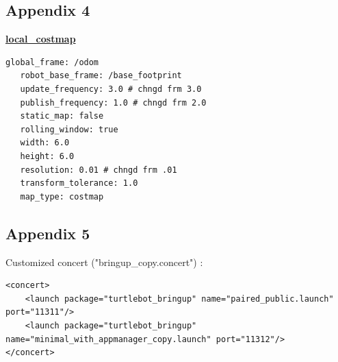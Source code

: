 \documentclass[10pt,a4paper]{article}
\begin{document}
\subsection{Appendix 4}

\underline{\textbf{local\_costmap}}
\begin{lstlisting}[frame=single]
   global_frame: /odom 
   robot_base_frame: /base_footprint 
   update_frequency: 3.0 # chngd frm 3.0 
   publish_frequency: 1.0 # chngd frm 2.0 
   static_map: false 
   rolling_window: true 
   width: 6.0 
   height: 6.0 
   resolution: 0.01 # chngd frm .01 
   transform_tolerance: 1.0 
   map_type: costmap
\end{lstlisting}
\newpage

\subsection{Appendix 5}

Customized concert ("bringup\_copy.concert") :
\begin{lstlisting}[frame=single]
<concert>
    <launch package="turtlebot_bringup" name="paired_public.launch" port="11311"/>
    <launch package="turtlebot_bringup" name="minimal_with_appmanager_copy.launch" port="11312"/>
</concert>

\end{lstlisting}
\end{document}
